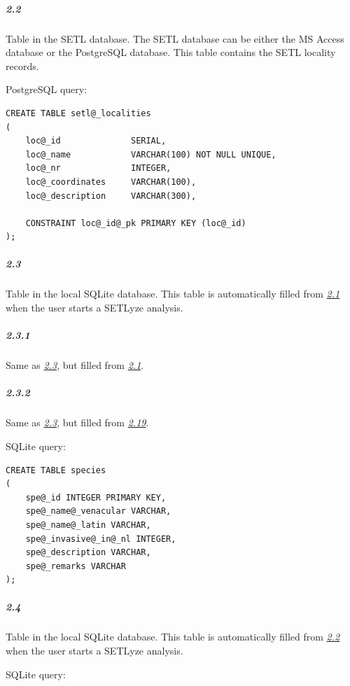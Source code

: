 \documentclass[letterpaper,10pt,english]{sphinxmanual}
\begin{document}
\subparagraph{2.2}
\label{design_parts_data:design-part-data-2-2}\label{design_parts_data:id3}
Table  in the SETL database. The SETL database can be
either the MS Access database or the PostgreSQL database. This table
contains the SETL locality records.

PostgreSQL query:

\begin{Verbatim}[commandchars=@\[\]]
CREATE TABLE setl@_localities
(
    loc@_id              SERIAL,
    loc@_name            VARCHAR(100) NOT NULL UNIQUE,
    loc@_nr              INTEGER,
    loc@_coordinates     VARCHAR(100),
    loc@_description     VARCHAR(300),

    CONSTRAINT loc@_id@_pk PRIMARY KEY (loc@_id)
);
\end{Verbatim}


\subparagraph{2.3}
\label{design_parts_data:id4}\label{design_parts_data:design-part-data-2-3}
Table  in the local SQLite database. This table is
automatically filled from {\hyperref[design_parts_data:design-part-data-2-1]{\emph{2.1}}} when the user
starts a SETLyze analysis.


\subparagraph{2.3.1}
\label{design_parts_data:design-part-data-2-3-1}\label{design_parts_data:id5}
Same as {\hyperref[design_parts_data:design-part-data-2-3]{\emph{2.3}}}, but filled from
{\hyperref[design_parts_data:design-part-data-2-1]{\emph{2.1}}}.


\subparagraph{2.3.2}
\label{design_parts_data:id6}\label{design_parts_data:design-part-data-2-3-2}
Same as {\hyperref[design_parts_data:design-part-data-2-3]{\emph{2.3}}}, but filled from
{\hyperref[design_parts_data:design-part-data-2-19]{\emph{2.19}}}.

SQLite query:

\begin{Verbatim}[commandchars=@\[\]]
CREATE TABLE species
(
    spe@_id INTEGER PRIMARY KEY,
    spe@_name@_venacular VARCHAR,
    spe@_name@_latin VARCHAR,
    spe@_invasive@_in@_nl INTEGER,
    spe@_description VARCHAR,
    spe@_remarks VARCHAR
);
\end{Verbatim}


\subparagraph{2.4}
\label{design_parts_data:id7}\label{design_parts_data:design-part-data-2-4}
Table  in the local SQLite database. This table is
automatically filled from {\hyperref[design_parts_data:design-part-data-2-2]{\emph{2.2}}} when the user
starts a SETLyze analysis.

SQLite query:
\end{document}
